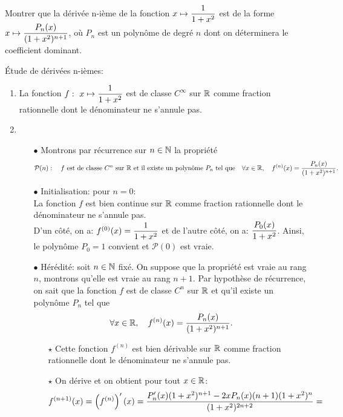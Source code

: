 \documentclass[a4paper, 11pt,reqno]{article}
\begin{document}
\begin{exercice}  \;
	Montrer que la d\'eriv\'ee n-i\`eme de la fonction $x\mapsto \displaystyle\frac{1}{1+x^2}$ est de la forme $x\mapsto \displaystyle\frac{P_n(x)}{(1+x^2)^{n+1}}$, o\`u $P_n$ est un polyn\^ome de degr\'e $n$ dont on d\'eterminera le coefficient dominant.
\end{exercice}
\begin{correction}   \;
	\'Etude de d\'eriv\'ees n-i\`emes:
	\begin{enumerate}
		\item La fonction $f:\ x\mapsto \displaystyle\frac{1}{1+x^2}$ est de classe $C^{\infty}$ sur $\mathbb{R}$ comme fraction rationnelle dont le d\'enominateur ne s'annule pas.
		\item
		      \begin{itemize}
			      \item[$\bullet$] Montrons par r\'ecurrence sur $n\in\mathbb{N}$ la propri\'et\'e
			            $$\mathcal{P}(n):\quad  f\ \hbox{est de classe}\ C^n\ \hbox{sur}\ \R\ \hbox{et il existe un polyn\^ome}\ P_n\ \hbox{tel que}\quad \forall x\in\R,\quad f^{(n)}(x)=\ddp\frac{P_n(x)}{(1+x^2)^{n+1}}.$$
			      \item[$\bullet$] Initialisation: pour $n=0$:\\
			            \noindent La fonction $f$ est bien continue sur $\mathbb{R}$ comme fraction rationnelle dont le d\'enominateur ne s'annule pas.\\
			            \noindent D'un c\^ot\'e, on a: $f^{(0)}(x)=\displaystyle\frac{1}{1+x^2}$ et de l'autre c\^ot\'e, on a: $\displaystyle\frac{P_0(x)}{1+x^2}$. Ainsi, le polyn\^ome $P_0=1$ convient et $\mathcal{P}(0)$ est vraie.
			      \item[$\bullet$] H\'er\'edit\'e: soit $n\in\mathbb{N}$ fix\'e. On suppose que la propri\'et\'e est vraie au rang $n$, montrons qu'elle est vraie au rang $n+1$. Par hypoth\`ese de r\'ecurrence, on sait que la fonction $f$ est de classe $C^n$ sur $\mathbb{R}$ et qu'il existe un polyn\^ome $P_n$ tel que
			            $$\forall x\in\mathbb{R},\quad f^{(n)}(x)=\displaystyle\frac{P_n(x)}{(1+x^2)^{n+1}}.$$
			            \begin{itemize}
				            \item[$\star$] Cette fonction $f^{(n)}$ est bien d\'erivable sur $\mathbb{R}$ comme fraction rationnelle dont le d\'enominateur ne s'annule pas.
				            \item[$\star$]
				                  On d\'erive et on obtient pour tout $x\in\mathbb{R}$:
				                  $$f^{(n+1)}(x)=\left(f^{(n)}\right)^{\prime}(x)=\displaystyle\frac{P_n^{\prime}(x)(1+x^2)^{n+1}-2xP_n(x)(n+1)(1+x^2)^n       }{(1+x^2)^{2n+2}}=
$$
\end{itemize}
\end{itemize}
\end{enumerate}
\end{correction}
\end{document}
